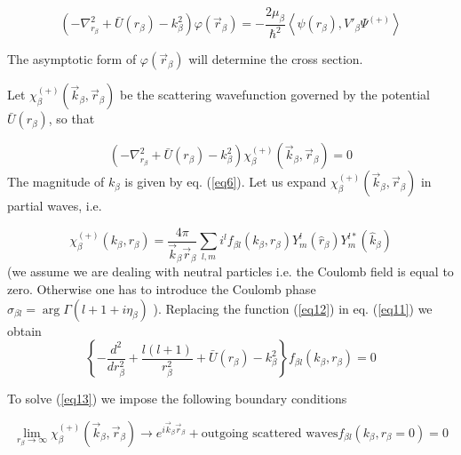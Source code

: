 \begin{equation}\label{eq10}
\left(-\nabla^2_{r_ \beta}+\bar U (r_ \beta)-k_\beta^2 \right)\varphi(\vec r_ \beta) =
-\frac{2 \mu_\beta}{\hbar^2}\left\langle  \psi(r_ \beta),V'_\beta \Psi^{(+)}\right\rangle
\end{equation}

The asymptotic form of $\varphi(\vec r_ \beta)$ will determine the cross section.


Let $\chi_\beta^{(+)}(\vec k_ \beta,\vec r_ \beta)$ be the scattering wavefunction governed by the potential $\bar U (r_ \beta)$, so that

\begin{equation}\label{eq11}
 \left(-\nabla^2_{r_ \beta}+\bar U (r_ \beta)-k_\beta^2 \right) \chi_\beta^{(+)}(\vec k_ \beta,\vec r_ \beta)=0
\end{equation}
The magnitude of $k_\beta$ is given by eq. (\ref{eq6}). Let us expand $\chi_\beta^{(+)}(\vec k_ \beta,\vec r_ \beta)$ in partial waves, i.e.

\begin{equation}\label{eq12}
\chi_\beta^{(+)}( k_ \beta, r_ \beta)=\frac{4\pi}{\vec k_ \beta \vec r_ \beta}\sum_{l,m} i^l f_{\beta l}( k_ \beta, r_ \beta) Y_m^l(\hat r_\beta)Y_m^{l*}(\hat k_\beta)
\end{equation}
(we assume we are dealing with neutral particles i.e. the Coulomb field is equal to zero. Otherwise one has to introduce the Coulomb phase $\sigma_{\beta l}=\arg \Gamma(l+1+i\eta_\beta)$ ).
Replacing the function (\ref{eq12}) in eq. (\ref{eq11}) we obtain
\begin{equation}\label{eq13}
\left\lbrace -\frac{d^2}{dr^2_\beta}+\frac{l(l+1)}{r^2_\beta}+\bar U (r_ \beta)-k_\beta^2\right\rbrace f_{\beta l}( k_ \beta, r_ \beta)=0
\end{equation}

To solve (\ref{eq13}) we impose the following boundary conditions

\begin{subequations}
 \begin{equation}\label{eq14a}
\lim_{r_\beta \rightarrow \infty} \chi_\beta^{(+)}(\vec k_ \beta,\vec r_ \beta) \longrightarrow e^{i \vec k_ \beta \vec r_ \beta} +
\text{outgoing scattered waves}
\end{equation}

\begin{equation}\label{eq14b}
f_{\beta l}( k_ \beta, r_ \beta=0)=0
\end{equation}

\end{subequations}

